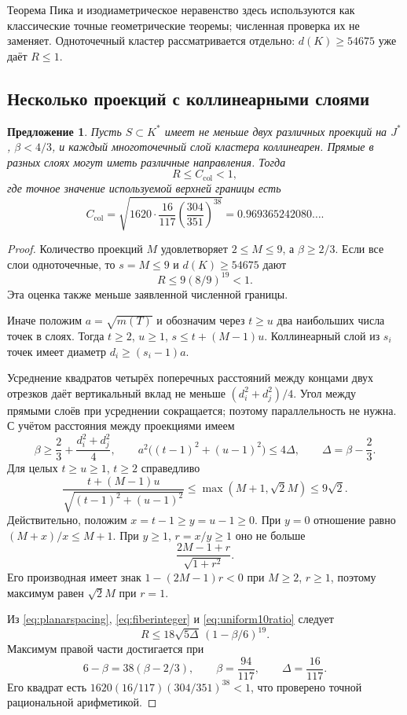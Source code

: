 \documentclass[11pt,a4paper]{article}
\newtheorem{proposition}[theorem]{Предложение}
\theoremstyle{remark}\newtheorem{remark}[theorem]{Замечание}
\begin{document}
Теорема Пика и изодиаметрическое неравенство здесь используются как классические точные геометрические теоремы; численная проверка их не заменяет. Одноточечный кластер рассматривается отдельно: $d(K)\ge54675$ уже даёт $R\le1$.

\subsection{Несколько проекций с коллинеарными слоями}

\begin{proposition}\label{prop:collinear10}
Пусть $S\subset K^*$ имеет не меньше двух различных проекций на $J^*$, $\beta<4/3$, и каждый многоточечный слой кластера коллинеарен. Прямые в разных слоях могут иметь различные направления. Тогда
\[
R\le C_{\mathrm{col}}<1,
\]
где точное значение используемой верхней границы есть
\[
C_{\mathrm{col}}=\sqrt{1620\cdot\frac{16}{117}
\left(\frac{304}{351}\right)^{38}}
=0.969365242080\ldots.
\]
\end{proposition}

\begin{proof}
Количество проекций $M$ удовлетворяет $2\le M\le9$, а $\beta\ge2/3$. Если все слои одноточечные, то $s=M\le9$ и $d(K)\ge54675$ дают
\[
R\le9(8/9)^{19}<1.
\]
Эта оценка также меньше заявленной численной границы.

Иначе положим $a=\sqrt{m(T)}$ и обозначим через $t\ge u$ два наибольших числа точек в слоях. Тогда $t\ge2$, $u\ge1$, $s\le t+(M-1)u$. Коллинеарный слой из $s_i$ точек имеет диаметр $d_i\ge(s_i-1)a$.

Усреднение квадратов четырёх поперечных расстояний между концами двух отрезков даёт вертикальный вклад не меньше $(d_i^2+d_j^2)/4$. Угол между прямыми слоёв при усреднении сокращается; поэтому параллельность не нужна. С учётом расстояния между проекциями имеем
\[
\beta\ge\frac23+\frac{d_i^2+d_j^2}{4},\qquad
a^2\big((t-1)^2+(u-1)^2\big)\le4\Delta,\qquad
\Delta=\beta-\frac23.
\]
Для целых $t\ge u\ge1$, $t\ge2$ справедливо
\begin{equation}\label{eq:fiberinteger}
\frac{t+(M-1)u}{\sqrt{(t-1)^2+(u-1)^2}}
\le\max(M+1,\sqrt2M)\le9\sqrt2.
\end{equation}
Действительно, положим $x=t-1\ge y=u-1\ge0$. При $y=0$ отношение равно $(M+x)/x\le M+1$. При $y\ge1$, $r=x/y\ge1$ оно не больше
\[
\frac{2M-1+r}{\sqrt{1+r^2}}.
\]
Его производная имеет знак $1-(2M-1)r<0$ при $M\ge2$, $r\ge1$, поэтому максимум равен $\sqrt2M$ при $r=1$.

Из \eqref{eq:planarspacing}, \eqref{eq:fiberinteger} и \eqref{eq:uniform10ratio} следует
\[
R\le18\sqrt{5\Delta}\,(1-\beta/6)^{19}.
\]
Максимум правой части достигается при
\[
6-\beta=38(\beta-2/3),\qquad
\beta=\frac{94}{117},\qquad \Delta=\frac{16}{117}.
\]
Его квадрат есть $1620(16/117)(304/351)^{38}<1$, что проверено точной рациональной арифметикой.
\end{proof}
\end{document}
